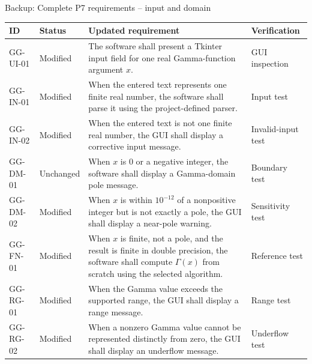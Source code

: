 \documentclass[10pt,aspectratio=169]{beamer}
\newcommand{\smallnote}[1]{\vspace{0.2em}{\scriptsize\textcolor{linegray}{#1}}}
\newcommand{\statusmodified}{\textcolor{softorange}{Modified}}
\newcommand{\statussame}{\textcolor{linegray}{Unchanged}}
\begin{document}
\begin{frame}{Backup: Complete P7 requirements -- input and domain}
\tiny
\renewcommand{\arraystretch}{1.12}
\begin{tabularx}{\textwidth}{>{\ttfamily}p{1.4cm}p{1.25cm}X p{1.55cm}}
\toprule
ID & Status & Updated requirement & Verification \\
\midrule
GG-UI-01 & \statusmodified & The software shall present a Tkinter input field for one real Gamma-function argument $x$. & GUI inspection \\
GG-IN-01 & \statusmodified & When the entered text represents one finite real number, the software shall parse it using the project-defined parser. & Input test \\
GG-IN-02 & \statusmodified & When the entered text is not one finite real number, the GUI shall display a corrective input message. & Invalid-input test \\
GG-DM-01 & \statussame & When $x$ is 0 or a negative integer, the software shall display a Gamma-domain pole message. & Boundary test \\
GG-DM-02 & \statusmodified & When $x$ is within $10^{-12}$ of a nonpositive integer but is not exactly a pole, the GUI shall display a near-pole warning. & Sensitivity test \\
GG-FN-01 & \statusmodified & When $x$ is finite, not a pole, and the result is finite in double precision, the software shall compute $\Gamma(x)$ from scratch using the selected algorithm. & Reference test \\
GG-RG-01 & \statusmodified & When the Gamma value exceeds the supported range, the GUI shall display a range message. & Range test \\
GG-RG-02 & \statusmodified & When a nonzero Gamma value cannot be represented distinctly from zero, the GUI shall display an underflow message. & Underflow test \\
\bottomrule
\end{tabularx}
\vfill\smallnote{Sources: [1], [2].}
\end{frame}
\end{document}
